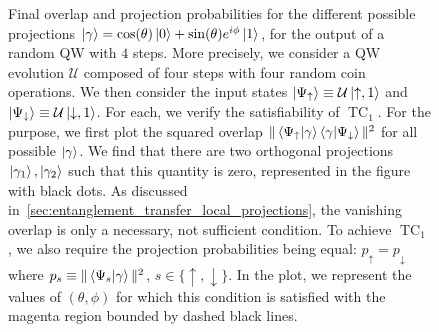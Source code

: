 \documentclass[
	aps, pra,
	superscriptaddress, twocolumn,
	floatfix,
	10pt
]{revtex4-1}
\newcommand{\on}[1]{\operatorname{#1}}
\newcommand{\calU}{{\mathcal{U}}}
\begin{document}
\begin{figure}[tb]
    \centering
    \caption{Final overlap and projection probabilities for the different possible projections $\ket\gamma=\cos(\theta)\ket0+\sin(\theta)e^{i\phi}\ket1$, for the output of a random QW with $4$ steps.
    More precisely, we consider a QW evolution $\calU$ composed of four steps with four random coin operations.
    We then consider the input states $\ket{\Psi_\uparrow}\equiv\calU\ket{\uparrow,1}$ and $\ket{\Psi_\downarrow}\equiv\calU\ket{\downarrow,1}$.
    For each, we verify the satisfiability of $\on{TC}_1$.
    For the purpose, we first plot the squared overlap $\|\braket{\Psi_\uparrow}{\gamma}\braket{\gamma}{\Psi_\downarrow}\|^2$ for all possible $\ket\gamma$.
    We find that there are two orthogonal projections $\ket{\gamma_1},\ket{\gamma_2}$ such that this quantity is zero, represented in the figure with black dots.
    As discussed in~\cref{sec:entanglement_transfer_local_projections}, the vanishing overlap is only a necessary, not sufficient condition. To achieve $\on{TC}_1$, we also require the projection probabilities being equal: $p_\uparrow=p_\downarrow$ where $p_s\equiv \|\braket{\Psi_s}{\gamma}\|^2$, $s\in\{\uparrow,\downarrow\}$.
    In the plot, we represent the values of $(\theta,\phi)$ for which this condition is satisfied with the magenta region bounded by dashed black lines.
}
\end{figure}
\end{document}
